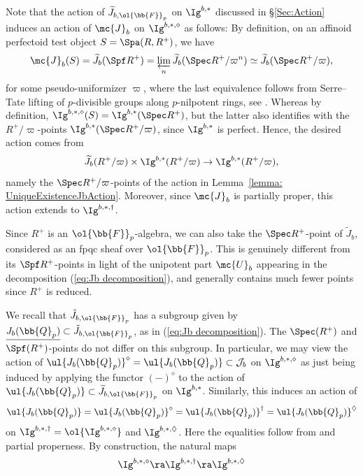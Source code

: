 \documentclass[letterpaper,11pt]{amsart}
\begin{document}
Note that the action of $\widetilde{J}_{b,\ol{\bb{F}}_{p}}$ on $\Ig^{b,\ast}$ discussed in \S\ref{Sec:Action} induces an action of $\mc{J}_b$ on $\Ig^{b,\ast,\diamond}$ as follows: By definition, on an affinoid perfectoid test object $S=\Spa(R,R^+)$, we have 
\[\mc{J}_b(S)=\widetilde{J}_b(\Spf R^+)=\varprojlim_n \widetilde{J}_b(\Spec R^+/\varpi^n)\simeq \widetilde{J}_b(\Spec R^+/\varpi),\]
for some pseudo-uniformizer $\varpi$, where the last equivalence follows from Serre--Tate lifting of $p$-divisible groups along $p$-nilpotent rings, see \cite[Theorem 2.4.1]{CS2}. Whereas by definition, $\Ig^{b,\ast,\diamond}(S)=\Ig^{b,\ast}(\Spec R^+)$, but the latter also identifies with the $R^+/\varpi$-points $\Ig^{b,\ast}(\Spec R^+/\varpi)$, since $\Ig^{b,\ast}$ is perfect. Hence, the desired action comes from
\[\widetilde{J}_b(R^+/\varpi)\times \Ig^{b,\ast}(R^+/\varpi)\to \Ig^{b,\ast}(R^+/\varpi),\]
namely the $\Spec R^+/\varpi$-points of the action in Lemma~\ref{lemma: UniqueExistenceJbAction}. Moreover, since $\mc{J}_b$ is partially proper, this action extends to $\Ig^{b,\ast,\dagger}$. 
\begin{remark}[Warning!]
    Since $R^+$ is an $\ol{\bb{F}}_p$-algebra, we can also take the $\Spec R^+$-point of $\widetilde{J}_b$, considered as an fpqc sheaf over $\ol{\bb{F}}_p$. This is genuinely different from its $\Spf R^+$-points in light of the unipotent part $\mc{U}_{b}$ appearing in the decomposition (\ref{eq:Jb decomposition}), and generally contains much fewer points since $R^+$ is reduced.
\end{remark}
We recall that $\tilde{J}_{b,\ol{\bb{F}}_{p}}$ has a subgroup given by $\underline{J_{b}(\bb{Q}_{p})} \subset \tilde{J}_{b,\ol{\bb{F}}_{p}}$, as in (\ref{eq:Jb decomposition}). The $\Spec(R^{+})$ and $\Spf(R^{+})$-points do not differ on this subgroup. In particular, we may view the action of $\ul{J_{b}(\bb{Q}_{p})}^{\diamond} =\ul{J_{b}(\bb{Q}_{p})} \subset \mathcal{J}_{b}$ on $\Ig^{b,*,\diamond}$ as just being induced by applying the functor $(-)^{\diamond}$ to the action of $\ul{J_{b}(\bb{Q}_{p})} \subset \widetilde{J}_{b,\ol{\bb{F}}_{p}}$ on $\Ig^{b,*}$. Similarly, this induces an action of 
\[\ul{J_{b}(\bb{Q}_{p})} = \ul{J_{b}(\bb{Q}_{p})}^{\diamond} = \ul{J_{b}(\bb{Q}_{p})}^{\dagger} = \ul{J_{b}(\bb{Q}_{p})}^{\Diamond}\] 
on $\Ig^{b,*,\dagger} = \ol{\Ig^{b,*,\diamond}}$ and $\Ig^{b,*,\Diamond}$. Here the equalities follow from \cite[Proposition~2.19]{GleasonIvanovMeromorphicVectorBundles} and partial properness. By construction, the natural maps 
\[ \Ig^{b,*,\diamond} \ra \Ig^{b,*,\dagger} \ra \Ig^{b,*,\Diamond} \]
\end{document}
